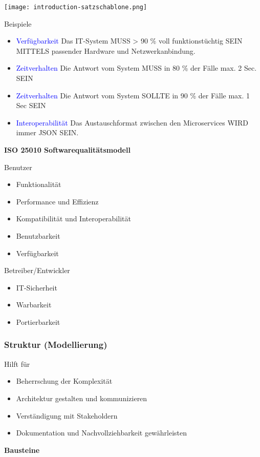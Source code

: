 \texttt{[image: introduction-satzschablone.png]}

Beispiele
\begin{itemize}
    \item \textcolor{blue}{Verfügbarkeit} Das IT-System MUSS > 90 \% voll funktionstüchtig SEIN MITTELS passender Hardware und Netzwerkanbindung.
    \item \textcolor{blue}{Zeitverhalten} Die Antwort vom System MUSS in 80 \% der Fälle max. 2 Sec. SEIN
    \item \textcolor{blue}{Zeitverhalten} Die Antwort vom System SOLLTE in 90 \% der Fälle max. 1 Sec SEIN
    \item \textcolor{blue}{Interoperabilität} Das Austauschformat zwischen den Microservices WIRD immer JSON SEIN.
\end{itemize}
\vspace{10pt}
\textbf{ISO 25010 Softwarequalitätsmodell}

Benutzer

\begin{itemize}
    \item Funktionalität
    \item Performance und Effizienz
    \item Kompatibilität und Interoperabilität
    \item Benutzbarkeit
    \item Verfügbarkeit
\end{itemize}

Betreiber/Entwickler

\begin{itemize}
    \item IT-Sicherheit
    \item Warbarkeit
    \item Portierbarkeit
\end{itemize}


\subsubsection{Struktur (Modellierung)}

Hilft für

\begin{itemize}
    \item Beherrschung der Komplexität
    \item Architektur gestalten und kommunizieren
    \item Verständigung mit Stakeholdern
    \item Dokumentation und Nachvollziehbarkeit gewährleisten
\end{itemize}
\vspace{10pt}
\textbf{Bausteine}

